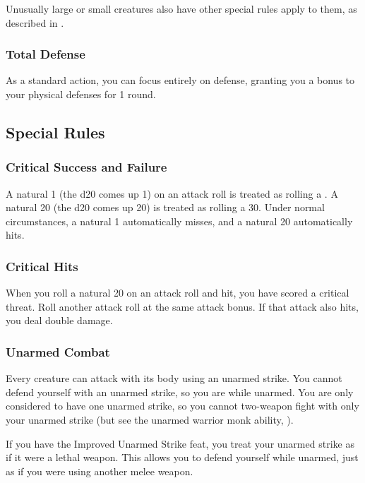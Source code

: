 Unusually large or small creatures also have other special rules apply to them, as described in .

\subsubsection{Total Defense}\label{Total Defense}
As a standard action, you can focus entirely on defense, granting you a  bonus to your physical defenses for 1 round.

\subsection{Special Rules}\label{Special Rules}

\subsubsection{Critical Success and Failure}\label{Critical Success and Failure}
A natural 1 (the d20 comes up 1) on an attack roll is treated as rolling a . A natural 20 (the d20 comes up 20) is treated as rolling a 30. Under normal circumstances, a natural 1 automatically misses, and a natural 20 automatically hits.

\subsubsection{Critical Hits}\label{Critical Hits}
When you roll a natural 20 on an attack roll and hit, you have scored a critical threat. Roll another attack roll at the same attack bonus. If that attack also hits, you deal double damage.


\subsubsection{Unarmed Combat}\label{Unarmed Combat}
Every creature can attack with its body using an unarmed strike. You cannot defend yourself with an unarmed strike, so you are  while unarmed. You are only considered to have one unarmed strike, so you cannot two-weapon fight with only your unarmed strike (but see the unarmed warrior monk ability, ).

If you have the Improved Unarmed Strike feat, you treat your unarmed strike as if it were a lethal weapon. This allows you to defend yourself while unarmed, just as if you were using another melee weapon.

